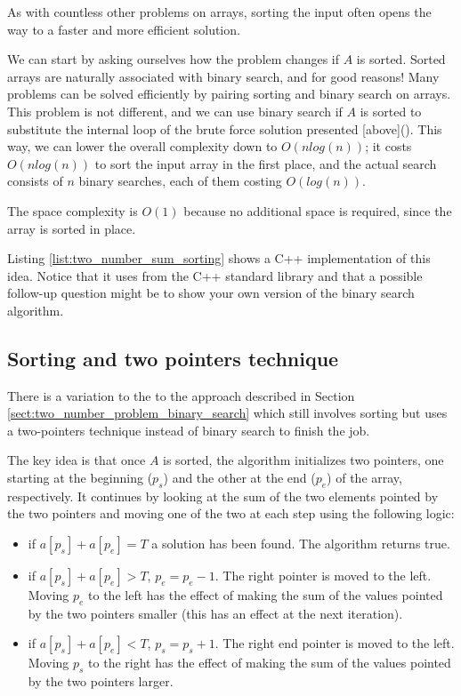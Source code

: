 As with countless other problems on arrays, sorting the input often opens the
way to a faster and more efficient solution. 

We can start by asking ourselves how the problem changes if  $A$ is sorted. Sorted arrays are naturally associated with binary search, and for good reasons! Many problems can be solved efficiently by pairing sorting and binary search on arrays. 
This problem is not different, and we can use binary search if $A$ is sorted to substitute the internal loop of the brute force solution presented [above](). This way, we can  lower the overall complexity down to $O(n log(n))$; it costs
$O(n log(n))$ to sort the input array in the first place, and the actual search consists of $n$ binary
searches, each of them costing $O(log(n))$. 

The space complexity is $O(1)$ because no additional space is required, since the array is sorted in place.

Listing \ref{list:two_number_sum_sorting} shows a C++ implementation of this idea. Notice that it uses  from the C++ standard library and that a possible follow-up question might be to show your own version of the binary search algorithm.






\subsection{Sorting and two pointers technique}
\label{sec:two_numbers:twopointers}

There is a variation to the to the approach described in Section
\ref{sect:two_number_problem_binary_search} which still involves sorting but uses a two-pointers
technique instead of binary search to finish the job. 

The key idea is that once $A$ is sorted, the algorithm initializes
two pointers, one starting at the beginning ($p_s$) and the other at the end ($p_e$) of the array, respectively.
It continues by looking at the sum of the two elements pointed by the two pointers and moving one of
the two at each step using the following logic: 
\begin{itemize}
	\item if $a[p_s]+a[p_e] = T$ a solution has been found. The algorithm returns true.
	\item if $a[p_s]+a[p_e] > T$, $p_e=p_e-1$. The right pointer is moved to the left. 
	Moving	$p_e$ to the left has the effect of making the sum of the values pointed by the two pointers smaller (this has an effect at the next iteration). 
	\item if $a[p_s]+a[p_e] < T$, $p_s=p_s+1$. The right end pointer is moved to the left. Moving $p_s$ to the right has the effect of making the sum of the values pointed by the two pointers larger. 
\end{itemize}



